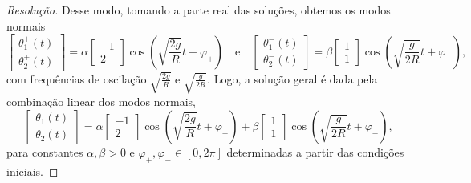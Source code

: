 \begin{proof}[Resolução]
    Desse modo, tomando a parte real das soluções, obtemos os modos normais
    \begin{equation*}
        \begin{bmatrix}
            \theta^+_1(t)\\\theta^+_2(t)
        \end{bmatrix}
        = \alpha \begin{bmatrix}
            -1\\2
        \end{bmatrix}
        \cos\left(\sqrt{\frac{2g}{R}}t + \varphi_+\right)
        \quad\text{e}\quad
        \begin{bmatrix}
            \theta^-_1(t)\\\theta^-_2(t)
        \end{bmatrix}
        = \beta \begin{bmatrix}
            1\\1
        \end{bmatrix}
        \cos\left(\sqrt{\frac{g}{2R}}t + \varphi_-\right),
    \end{equation*}
    com frequências de oscilação \(\sqrt{\frac{2g}{R}}\) e \(\sqrt{\frac{g}{2R}}\). Logo, a solução geral é dada pela combinação linear dos modos normais,
    \begin{equation*}
        \begin{bmatrix}
            \theta_1(t)\\\theta_2(t)
        \end{bmatrix}
        = \alpha \begin{bmatrix}
            -1\\2
        \end{bmatrix}
        \cos\left(\sqrt{\frac{2g}{R}}t + \varphi_+\right)
        + \beta \begin{bmatrix}
            1\\1
        \end{bmatrix}
        \cos\left(\sqrt{\frac{g}{2R}}t + \varphi_-\right),
    \end{equation*}
    para constantes \(\alpha, \beta > 0\) e \(\varphi_+, \varphi_- \in [0, 2\pi]\) determinadas a partir das condições iniciais.


\end{proof}
